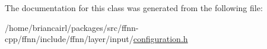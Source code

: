 The documentation for this class was generated from the following file\-:\begin{DoxyCompactItemize}
\item 
/home/briancairl/packages/src/ffnn-\/cpp/ffnn/include/ffnn/layer/input/\hyperlink{input_2configuration_8h}{configuration.\-h}\end{DoxyCompactItemize}
